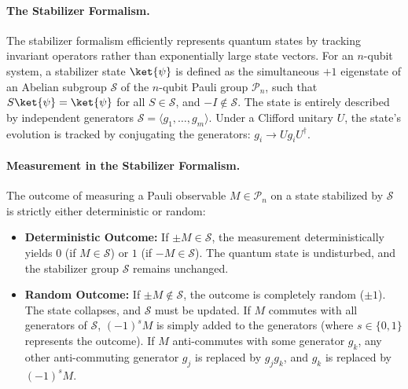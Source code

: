 \documentclass[acmsmallw,review]{acmart}
\begin{document}
\paragraph{\textbf{The Stabilizer Formalism.}}
The stabilizer formalism efficiently represents quantum states by tracking invariant operators rather than exponentially large state vectors. For an $n$-qubit system, a stabilizer state $\ket{\psi}$ is defined as the simultaneous $+1$ eigenstate of an Abelian subgroup $\mathcal{S}$ of the $n$-qubit Pauli group $\mathcal{P}_n$, such that $S\ket{\psi} = \ket{\psi}$ for all $S \in \mathcal{S}$, and $-I \notin \mathcal{S}$. The state is entirely described by independent generators $\mathcal{S} = \langle g_1, \dots, g_m \rangle$. Under a Clifford unitary $U$, the state's evolution is tracked by conjugating the generators: $g_i \to U g_i U^\dagger$.

\paragraph{\textbf{Measurement in the Stabilizer Formalism.}}
The outcome of measuring a Pauli observable $M \in \mathcal{P}_n$ on a state stabilized by $\mathcal{S}$ is strictly either deterministic or random:
\begin{itemize}
    \item \textbf{Deterministic Outcome:} If $\pm M \in \mathcal{S}$, the measurement deterministically yields $0$ (if $M \in \mathcal{S}$) or $1$ (if $-M \in \mathcal{S}$). The quantum state is undisturbed, and the stabilizer group $\mathcal{S}$ remains unchanged.
    \item \textbf{Random Outcome:} If $\pm M \notin \mathcal{S}$, the outcome is completely random ($\pm 1$). The state collapses, and $\mathcal{S}$ must be updated. If $M$ commutes with all generators of $\mathcal{S}$, $(-1)^s M$ is simply added to the generators (where $s \in \{0,1\}$ represents the outcome). If $M$ anti-commutes with some generator $g_k$, any other anti-commuting generator $g_j$ is replaced by $g_j g_k$, and $g_k$ is replaced by $(-1)^s M$.
\end{itemize}
\end{document}
